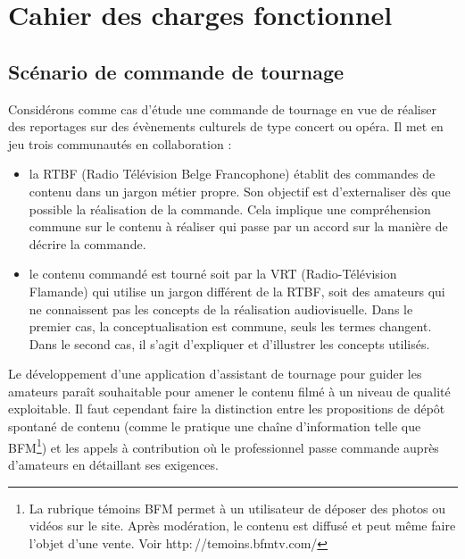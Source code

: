 



\section{Cahier des charges fonctionnel}\label{sec:cdcf}


\subsection{Scénario de commande de tournage}\label{sec:scenar}
Considérons comme cas d'étude une commande de tournage en vue de réaliser des reportages sur des évènements culturels de type concert ou opéra. 
Il met en jeu trois communautés en collaboration :

\begin{itemize}
	\item la RTBF (Radio Télévision Belge Francophone) établit des commandes de contenu dans un jargon métier propre. Son objectif est d'externaliser dès que possible la réalisation de la commande. Cela implique une compréhension commune sur le contenu à réaliser qui passe par un accord sur la manière de décrire la commande. 
	
	\item le contenu commandé est tourné soit par la VRT (Radio-Télévision Flamande) qui utilise un jargon différent de la RTBF, soit des amateurs qui ne connaissent pas les concepts de la réalisation audiovisuelle. Dans le premier cas, la conceptualisation est commune, seuls les termes changent. Dans le second cas, il s'agit d'expliquer et d'illustrer les concepts utilisés.\\
\end{itemize}

Le développement d'une application d'assistant de tournage pour guider les amateurs paraît souhaitable pour amener le contenu filmé à un niveau de qualité exploitable. 
Il faut cependant faire la distinction entre les propositions de dépôt spontané de contenu (comme le pratique une chaîne d'information telle que BFM\footnote{La rubrique témoins BFM permet à un utilisateur de déposer des photos ou vidéos sur le site. 
Après modération, le contenu est diffusé et peut même faire l'objet d'une vente. Voir http$:$//temoins.bfmtv.com/}) et les appels à contribution où le professionnel passe commande auprès d'amateurs en détaillant ses exigences. 

